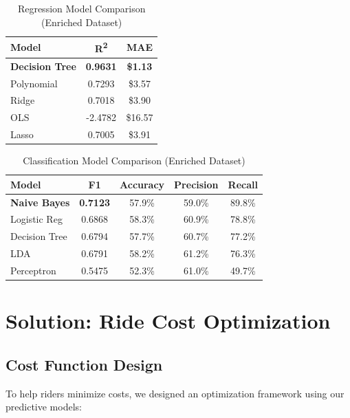 \documentclass[12pt,a4paper]{article}
\begin{document}
\begin{table}[H]
\centering
\caption{Regression Model Comparison (Enriched Dataset)}
\begin{tabular}{lcc}
\toprule
\textbf{Model} & \textbf{R\textsuperscript{2}} & \textbf{MAE} \\
\midrule
\textbf{Decision Tree} & \textbf{0.9631} & \textbf{\$1.13} \\
Polynomial & 0.7293 & \$3.57 \\
Ridge & 0.7018 & \$3.90 \\
OLS & -2.4782 & \$16.57 \\
Lasso & 0.7005 & \$3.91 \\
\bottomrule
\end{tabular}
\end{table}

\begin{table}[H]
\centering
\caption{Classification Model Comparison (Enriched Dataset)}
\begin{tabular}{lcccc}
\toprule
\textbf{Model} & \textbf{F1} & \textbf{Accuracy} & \textbf{Precision} & \textbf{Recall} \\
\midrule
\textbf{Naive Bayes} & \textbf{0.7123} & 57.9\% & 59.0\% & 89.8\% \\
Logistic Reg & 0.6868 & 58.3\% & 60.9\% & 78.8\% \\
Decision Tree & 0.6794 & 57.7\% & 60.7\% & 77.2\% \\
LDA & 0.6791 & 58.2\% & 61.2\% & 76.3\% \\
Perceptron & 0.5475 & 52.3\% & 61.0\% & 49.7\% \\
\bottomrule
\end{tabular}
\end{table}

\newpage

\section{Solution: Ride Cost Optimization}

\subsection{Cost Function Design}

To help riders minimize costs, we designed an optimization framework using our predictive models:
\end{document}
